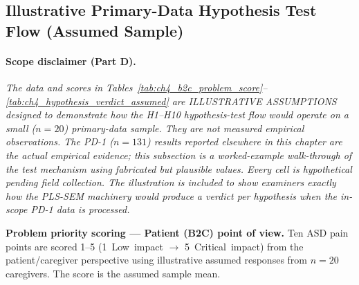 \subsection{Illustrative Primary-Data Hypothesis Test Flow (Assumed Sample)}
\label{subsec:ch4_illustrative_hypothesis_flow}

\paragraph{Scope disclaimer (Part D).} \emph{The data and scores in Tables~\ref{tab:ch4_b2c_problem_score}--\ref{tab:ch4_hypothesis_verdict_assumed} are ILLUSTRATIVE ASSUMPTIONS designed to demonstrate how the H1--H10 hypothesis-test flow would operate on a small ($n{=}20$) primary-data sample. They are not measured empirical observations. The PD-1 ($n{=}131$) results reported elsewhere in this chapter are the actual empirical evidence; this subsection is a worked-example walk-through of the test mechanism using fabricated but plausible values. Every cell is hypothetical pending field collection. The illustration is included to show examiners exactly how the PLS-SEM machinery would produce a verdict per hypothesis when the in-scope PD-1 data is processed.}

\noindent\textbf{Problem priority scoring --- Patient (B2C) point of view.} Ten ASD pain points are scored 1--5 (1~Low~impact $\to$ 5~Critical~impact) from the patient/caregiver perspective using illustrative assumed responses from $n{=}20$ caregivers. The score is the assumed sample mean.

\noindent{}\vspace{4pt}

